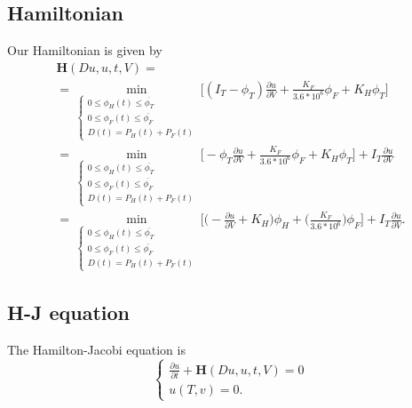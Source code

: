 \documentclass[12pt]{article}
\theoremstyle{definition}
\theoremstyle{remark}
\begin{document}
\subsection{Hamiltonian}

Our Hamiltonian is given by
\begin{multline*}
\mathbf{H}(Du,u,t,V)=\\
=\min_{\begin{cases}
0\leq\phi_H(t)\leq\overline{\phi_T}\\
0\leq\phi_F(t)\leq\overline{\phi_F}\\
D(t)=P_H(t)+P_F(t)
\end{cases}}\Bigg[(I_T-\phi_T)\frac{\partial u}{\partial V}+\frac{K_F}{3.6*10^6}\phi_F+K_H\phi_T\Bigg]\\
=\min_{\begin{cases}
0\leq\phi_H(t)\leq\overline{\phi_T}\\
0\leq\phi_F(t)\leq\overline{\phi_F}\\
D(t)=P_H(t)+P_F(t)
\end{cases}}\Bigg[-\phi_T\frac{\partial u}{\partial V}+\frac{K_F}{3.6*10^6}\phi_F+K_H\phi_T\Bigg]+I_T\frac{\partial u}{\partial V}\\
=\min_{\begin{cases}
0\leq\phi_H(t)\leq\overline{\phi_T}\\
0\leq\phi_F(t)\leq\overline{\phi_F}\\
D(t)=P_H(t)+P_F(t)
\end{cases}}\Bigg[\Bigg(-\frac{\partial u}{\partial V}+K_H\Bigg)\phi_H+\Bigg(\frac{K_F}{3.6*10^6}\Bigg)\phi_F\Bigg]+I_T\frac{\partial u}{\partial V}.
\end{multline*}

\subsection{H-J equation}

The Hamilton-Jacobi equation is
\begin{equation*}
\begin{cases}
\frac{\partial u}{\partial t}+\mathbf{H}(Du,u,t,V)=0\\
u(T,v)=0.
\end{cases}
\end{equation*}
\end{document}
